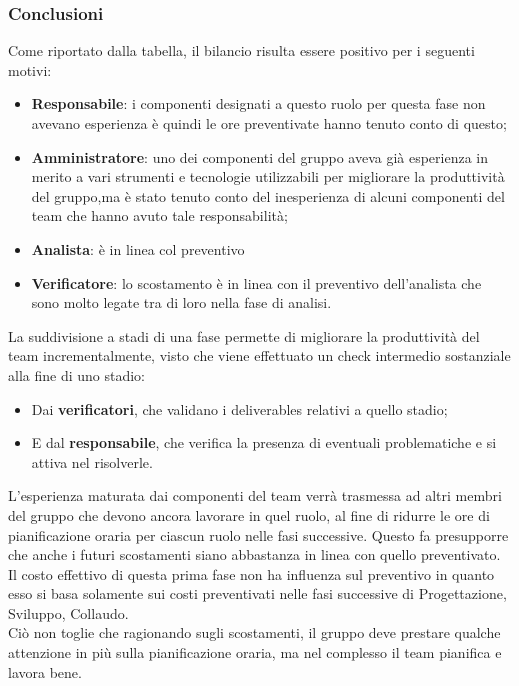 \subsubsection{Conclusioni}
Come riportato dalla tabella, il bilancio risulta essere positivo per i seguenti motivi:
\begin{itemize}
	\item \textbf{Responsabile}: {i componenti designati a questo ruolo per questa fase non avevano esperienza è quindi le ore preventivate hanno tenuto conto di questo; }
	\item \textbf{Amministratore}: {uno dei componenti del gruppo aveva già esperienza in merito a vari strumenti e tecnologie utilizzabili per migliorare la produttività del gruppo,ma è stato tenuto 
	conto del inesperienza di alcuni componenti del team che hanno avuto tale responsabilità;}
	\item \textbf{Analista}: {è in linea col preventivo}
	\item \textbf{Verificatore}: {lo scostamento è in linea con il preventivo dell'analista che sono molto legate tra di loro nella fase di analisi.}
\end{itemize}
La suddivisione a stadi di una fase permette di migliorare la produttività del team incrementalmente, visto che viene effettuato un check intermedio sostanziale alla fine di uno stadio:
\begin{itemize}
	\item Dai \textbf{verificatori}, che validano i deliverables relativi a quello stadio;
	\item E dal \textbf{responsabile}, che verifica la presenza di eventuali problematiche e si attiva nel risolverle.
\end{itemize}
L'esperienza maturata dai componenti del team verrà trasmessa ad altri membri del gruppo che devono ancora lavorare in quel ruolo, al fine di ridurre le ore di pianificazione oraria per ciascun ruolo nelle fasi successive.
Questo fa presupporre che anche i futuri scostamenti siano abbastanza in linea con quello preventivato.
Il costo effettivo di questa prima fase non ha influenza sul preventivo in quanto esso si basa solamente sui costi preventivati nelle fasi successive di Progettazione, Sviluppo, Collaudo.\\
Ciò non toglie che ragionando sugli scostamenti, il gruppo deve prestare qualche attenzione in più sulla pianificazione oraria, ma nel complesso il team pianifica e lavora bene.
